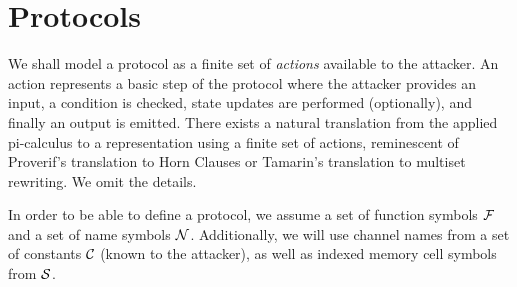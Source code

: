 \section{Protocols}

We shall model a protocol as a finite set of \emph{actions} available to the
attacker. An action represents a basic step of the protocol where
the attacker provides an input, a condition is checked, 
state updates are performed (optionally), and finally an output is emitted.
There exists a natural translation from the applied pi-calculus to a representation using a finite set of actions, reminescent of Proverif's translation to Horn
Clauses or Tamarin's translation to multiset rewriting. We omit the details.

In order to be able to define a protocol, we assume a set of function
symbols $\mathcal{F}$ and a set of name symbols $\mathcal{N}$.
Additionally, we will use channel names from a set of constants $\mathcal{C}$ (known to the attacker),
as well as indexed memory cell symbols from $\mathcal{S}$.

